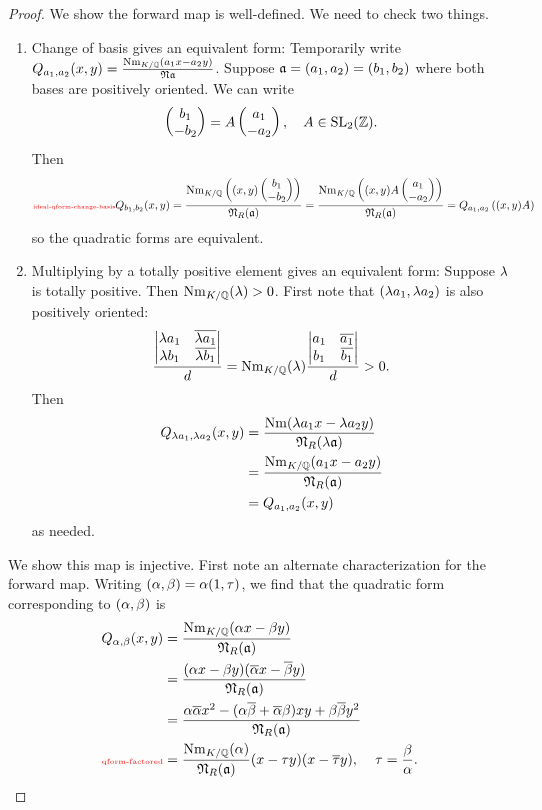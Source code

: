 \begin{proof}
 We show the forward map is well-defined. We need to check two things.
\begin{enumerate}
\item Change of basis gives an equivalent form: 
Temporarily write $Q_{a_1,a_2}(x,y)=\frac{\operatorname{Nm}_{K/\mathbb{Q}}(a_1x-a_2y)}{\mathfrak N\mathfrak{a}}$.
Suppose $\mathfrak{a}=(a_1,a_2)=(b_1,b_2)$ where both bases are positively oriented. We can write
\[
\begin{pmatrix} {b_1}\\ {-b_2} \end{pmatrix}=A\begin{pmatrix} {a_1}\\ {-a_2} \end{pmatrix},\quad A\in \operatorname{SL}_2(\mathbb{Z}).
\]
Then 
\begin{equation}\llabel{ideal-qform-change-basis}
Q_{b_1,b_2}(x,y)=
\frac{\nm_{K/\Q}\pa{(x,y)\coltwo{b_1}{-b_2}}}{\mathfrak N_{R} (\ma)}=
\frac{\nm_{K/\Q}\pa{(x,y)A\coltwo{a_1}{-a_2}}}{\mathfrak N_R (\ma)}=
Q_{a_1,a_2}\pa{
(x,y)A
}
\end{equation}
so the quadratic forms are equivalent.
\item Multiplying by a totally positive element gives an equivalent form: Suppose $\lambda$ is totally positive. Then $\operatorname{Nm}_{K/\mathbb{Q}}(\lambda)>0$. First note that $(\lambda a_1,\lambda a_2)$ is also positively oriented:
\[
\frac{\left| { \begin{matrix} {\lambda a_1}&{\overline{\lambda a_1}}\\ {\lambda b_1}&{\overline{\lambda b_1}} \end{matrix} } \right|}{d}
=
\operatorname{Nm}_{K/\mathbb{Q}}(\lambda)\frac{\left| { \begin{matrix} {a_1}&{\overline{a_1}}\\ {b_1}&{\overline{b_1}} \end{matrix} } \right|}{d}>0.
\]
Then
\begin{align*}
Q_{\lambda a_1,\lambda a_2}(x,y)&=
\frac{\operatorname{Nm}(\lambda a_1x-\lambda a_2 y)}{\mathfrak N_R(\lambda \mathfrak{a})}\\
&=\frac{\operatorname{Nm}_{K/\mathbb{Q}}(a_1x-a_2y)}{\mathfrak N_R(\mathfrak{a})}\\
&=Q_{a_1,a_2}(x,y)
\end{align*}
as needed.
\end{enumerate}
 We show this map is injective.
First note an alternate characterization for the forward map. Writing $(\alpha,\beta)=\alpha(1,\tau)$, we find that the quadratic form corresponding to $(\alpha,\beta)$ is
\begin{align}
\nonumber
Q_{\al,\be}(x,y)&=\frac{\nm_{K/\Q}(\al x-\be y)}{\mathfrak N_R(\ma)}\\
\nonumber
&=\frac{(\al x-\be y)(\ol{\al}x-\ol{\be}y)}{\mathfrak N_R(\ma)}\\
\nonumber
&=\frac{\al\ol{\al}x^2 -(\al\ol{\be}+\ol{\al}\be)xy+\be\ol{\be} y^2}{\mathfrak N_R(\ma)}\\
\llabel{qform-factored}
&=\frac{\nm_{K/\Q}(\al)}{\mathfrak N_R(\ma)}(x-\tau y)(x-\ol{\tau} y),&\tau=\frac{\be}{\al}.
\end{align}


\end{proof}

